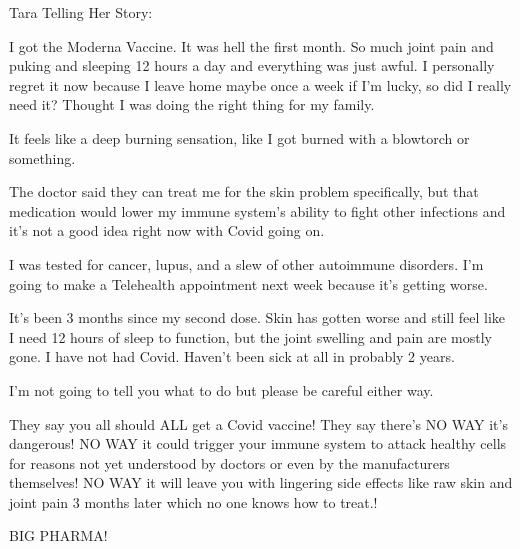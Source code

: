 Tara Telling Her Story:

I got the Moderna Vaccine. It was hell the first month. So much joint pain and
puking and sleeping 12 hours a day and everything was just awful. I personally
regret it now because I leave home maybe once a week if I’m lucky, so did I
really need it? Thought I was doing the right thing for my family.

It feels like a deep burning sensation, like I got burned with a blowtorch or
something.

The doctor said they can treat me for the skin problem specifically, but that
medication would lower my immune system’s ability to fight other infections and
it’s not a good idea right now with Covid going on.

I was tested for cancer, lupus, and a slew of other autoimmune disorders. I’m
going to make a Telehealth appointment next week because it’s getting worse.

It’s been 3 months since my second dose. Skin has gotten worse and still feel
like I need 12 hours of sleep to function, but the joint swelling and pain are
mostly gone. I have not had Covid. Haven’t been sick at all in probably 2 years.

I’m not going to tell you what to do but please be careful either way.

They say you all should ALL get a Covid vaccine! They say there’s NO WAY it’s
dangerous! NO WAY it could trigger your immune system to attack healthy cells
for reasons not yet understood by doctors or even by the manufacturers
themselves! NO WAY it will leave you with lingering side effects like raw skin
and joint pain 3 months later which no one knows how to treat.!

BIG PHARMA!

